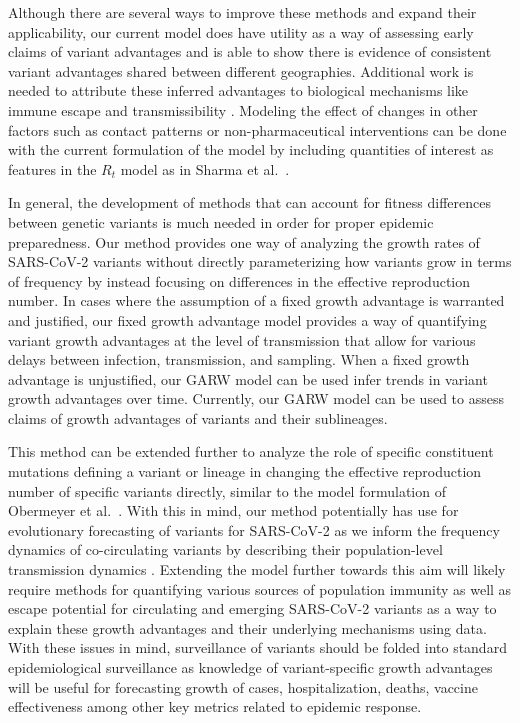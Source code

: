 Although there are several ways to improve these methods and expand their applicability, our current model does have utility as a way of assessing early claims of variant advantages and is able to show there is evidence of consistent variant advantages shared between different geographies.
Additional work is needed to attribute these inferred advantages to biological mechanisms like immune escape and transmissibility \cite{tao2021biological}.
Modeling the effect of changes in other factors such as contact patterns or non-pharmaceutical interventions can be done with the current formulation of the model by including quantities of interest as features in the $R_{t}$ model as in Sharma et al.\ \cite{Sharma2021}.

In general, the development of methods that can account for fitness differences between genetic variants is much needed in order for proper epidemic preparedness.
Our method provides one way of analyzing the growth rates of SARS-CoV-2 variants without directly parameterizing how variants grow in terms of frequency by instead focusing on differences in the effective reproduction number.
In cases where the assumption of a fixed growth advantage is warranted and justified, our fixed growth advantage model provides a way of quantifying variant growth advantages at the level of transmission that allow for various delays between infection, transmission, and sampling.
When a fixed growth advantage is unjustified, our GARW model can be used infer trends in variant growth advantages over time.
Currently, our GARW model can be used to assess claims of growth advantages of variants and their sublineages.

This method can be extended further to analyze the role of specific constituent mutations defining a variant or lineage in changing the effective reproduction number of specific variants directly, similar to the model formulation of Obermeyer et al.\ \cite{obermeyer2022analysis}.
With this in mind, our method potentially has use for evolutionary forecasting of variants for SARS-CoV-2 as we inform the frequency dynamics of co-circulating variants by describing their population-level transmission dynamics \cite{abousamra2024fitness}.
Extending the model further towards this aim will likely require methods for quantifying various sources of population immunity as well as escape potential for circulating and emerging SARS-CoV-2 variants as a way to explain these growth advantages and their underlying mechanisms using data.
With these issues in mind, surveillance of variants should be folded into standard epidemiological surveillance as knowledge of variant-specific growth advantages will be useful for forecasting growth of cases, hospitalization, deaths, vaccine effectiveness among other key metrics related to epidemic response.

